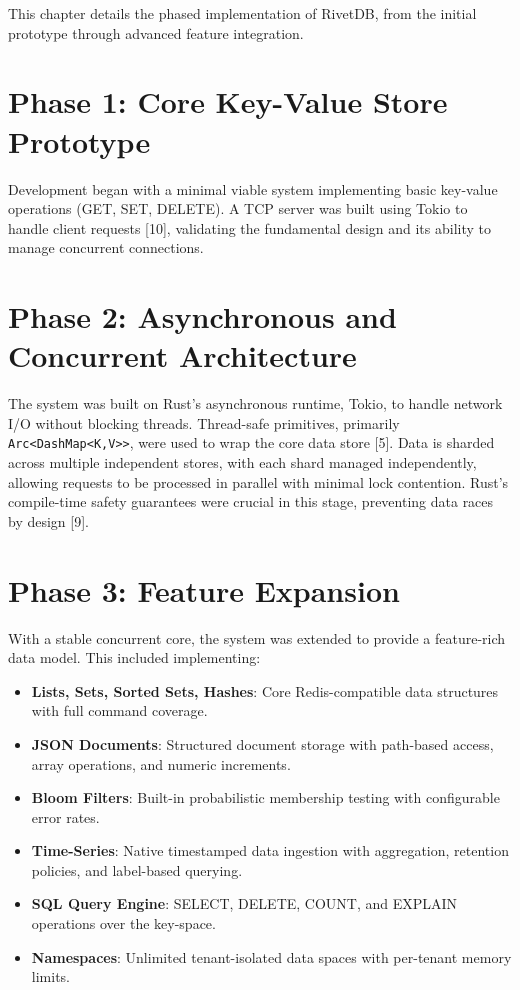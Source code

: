 \documentclass[12pt,a4paper]{report}
\begin{document}
This chapter details the phased implementation of RivetDB, from the initial prototype through advanced feature integration.

\section{Phase 1: Core Key-Value Store Prototype}

Development began with a minimal viable system implementing basic key-value operations (GET, SET, DELETE). A TCP server was built using Tokio to handle client requests [10], validating the fundamental design and its ability to manage concurrent connections.

\section{Phase 2: Asynchronous and Concurrent Architecture}

The system was built on Rust's asynchronous runtime, Tokio, to handle network I/O without blocking threads. Thread-safe primitives, primarily \texttt{Arc<DashMap<K,V>{}>}, were used to wrap the core data store [5]. Data is sharded across multiple independent stores, with each shard managed independently, allowing requests to be processed in parallel with minimal lock contention. Rust's compile-time safety guarantees were crucial in this stage, preventing data races by design [9].

\section{Phase 3: Feature Expansion}

With a stable concurrent core, the system was extended to provide a feature-rich data model. This included implementing:

\begin{itemize}[leftmargin=2.5em]
    \item \textbf{Lists, Sets, Sorted Sets, Hashes}: Core Redis-compatible data structures with full command coverage.
    \item \textbf{JSON Documents}: Structured document storage with path-based access, array operations, and numeric increments.
    \item \textbf{Bloom Filters}: Built-in probabilistic membership testing with configurable error rates.
    \item \textbf{Time-Series}: Native timestamped data ingestion with aggregation, retention policies, and label-based querying.
    \item \textbf{SQL Query Engine}: SELECT, DELETE, COUNT, and EXPLAIN operations over the key-space.
    \item \textbf{Namespaces}: Unlimited tenant-isolated data spaces with per-tenant memory limits.
\end{itemize}
\end{document}
